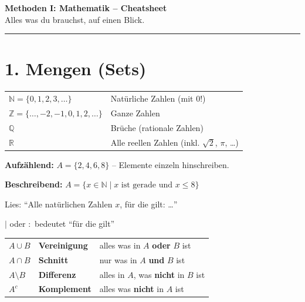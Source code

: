 \documentclass[10pt, a4paper]{article}
\begin{document}
\begin{center}
    {\LARGE\textbf{Methoden I: Mathematik -- Cheatsheet}} \\[4pt]
    {\large Alles was du brauchst, auf einen Blick.}
\end{center}

\hrule
\vspace{0.5em}

\section*{1. Mengen (Sets)}

\begin{defbox}[Zahlenmengen]
\begin{tabular}{ll}
    $\mathbb{N} = \{0, 1, 2, 3, \ldots\}$ & Nat\"urliche Zahlen (mit 0!) \\
    $\mathbb{Z} = \{\ldots, -2, -1, 0, 1, 2, \ldots\}$ & Ganze Zahlen \\
    $\mathbb{Q}$ & Br\"uche (rationale Zahlen) \\
    $\mathbb{R}$ & Alle reellen Zahlen (inkl. $\sqrt{2}$, $\pi$, \ldots)
\end{tabular}
\end{defbox}

\begin{defbox}[Schreibweisen]
\textbf{Aufz\"ahlend:} $A = \{2, 4, 6, 8\}$ -- Elemente einzeln hinschreiben.

\textbf{Beschreibend:} $A = \{x \in \mathbb{N} \mid x \text{ ist gerade und } x \leq 8\}$

Lies: "`Alle nat\"urlichen Zahlen $x$, f\"ur die gilt: \ldots"'

$\mid$ oder $:$ bedeutet "`f\"ur die gilt"'
\end{defbox}

\begin{defbox}
\begin{tabular}{lll}
    $A \cup B$ & \textbf{Vereinigung} & alles was in $A$ \textbf{oder} $B$ ist \\
    $A \cap B$ & \textbf{Schnitt} & nur was in $A$ \textbf{und} $B$ ist \\
    $A \setminus B$ & \textbf{Differenz} & alles in $A$, was \textbf{nicht} in $B$ ist \\
    $A^c$ & \textbf{Komplement} & alles was \textbf{nicht} in $A$ ist
\end{tabular}
\end{defbox}
\end{document}
